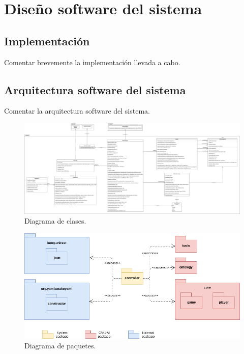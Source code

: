 
\chapter{Diseño software del sistema}

\section{Implementación}

Comentar brevemente la implementación llevada a cabo.

\section{Arquitectura software del sistema}

Comentar la arquitectura software del sistema.

\begin{figure}[H]
    \centering
    \includegraphics[angle=90, origin=c, scale=0.18]{img/CH07/class_diagram.png}
    \caption{Diagrama de clases.}
    \label{fig:class_diagram}
\end{figure}

\begin{figure}[H]
    \centering
    \includegraphics[scale=0.48]{img/CH07/package_diagram.png}
    \caption{Diagrama de paquetes.}
    \label{fig:package_diagram}
\end{figure}

